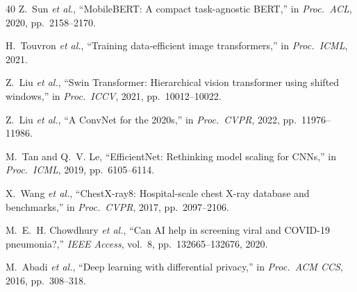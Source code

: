 \documentclass[conference]{IEEEtran}
\begin{document}
\begin{thebibliography}{40}
Z.~Sun \emph{et al.},
``MobileBERT: A compact task-agnostic BERT,''
in \emph{Proc.\ ACL}, 2020, pp.\ 2158--2170.

H.~Touvron \emph{et al.},
``Training data-efficient image transformers,''
in \emph{Proc.\ ICML}, 2021.

Z.~Liu \emph{et al.},
``Swin Transformer: Hierarchical vision transformer using shifted windows,''
in \emph{Proc.\ ICCV}, 2021, pp.\ 10012--10022.

Z.~Liu \emph{et al.},
``A ConvNet for the 2020s,''
in \emph{Proc.\ CVPR}, 2022, pp.\ 11976--11986.

M.~Tan and Q.~V. Le,
``EfficientNet: Rethinking model scaling for CNNs,''
in \emph{Proc.\ ICML}, 2019, pp.\ 6105--6114.

X.~Wang \emph{et al.},
``ChestX-ray8: Hospital-scale chest X-ray database and benchmarks,''
in \emph{Proc.\ CVPR}, 2017, pp.\ 2097--2106.

M.~E.~H. Chowdhury \emph{et al.},
``Can AI help in screening viral and COVID-19 pneumonia?,''
\emph{IEEE Access}, vol.\ 8, pp.\ 132665--132676, 2020.

M.~Abadi \emph{et al.},
``Deep learning with differential privacy,''
in \emph{Proc.\ ACM CCS}, 2016, pp.\ 308--318.

\end{thebibliography}
\end{document}

